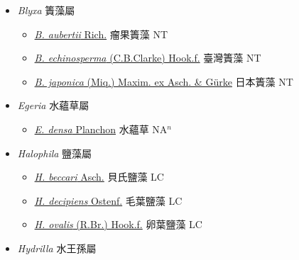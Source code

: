 
  \begin{itemize}
 \item[] \textit{Blyxa} 簀藻屬
                    
  \begin{itemize}
        \item[] \href{http://www.theplantlist.org/tpl1.1/search?q=Blyxa+aubertii}{\textit{B. aubertii} Rich.}   瘤果簀藻 NT
        \item[] \href{http://www.theplantlist.org/tpl1.1/search?q=Blyxa+echinosperma}{\textit{B. echinosperma} (C.B.Clarke) Hook.f.}   臺灣簀藻 NT
        \item[] \href{http://www.theplantlist.org/tpl1.1/search?q=Blyxa+japonica}{\textit{B. japonica} (Miq.) Maxim. ex Asch. \& Gürke}   日本簀藻 NT
  \end{itemize}
 \item[] \textit{Egeria} 水蘊草屬
                    
  \begin{itemize}
        \item[] \href{http://www.theplantlist.org/tpl1.1/search?q=Egeria+densa}{\textit{E. densa} Planchon}   水蘊草 NA$^n$
  \end{itemize}
 \item[] \textit{Halophila} 鹽藻屬
                    
  \begin{itemize}
        \item[] \href{http://www.theplantlist.org/tpl1.1/search?q=Halophila+beccari}{\textit{H. beccari} Asch.}   貝氏鹽藻 LC
        \item[] \href{http://www.theplantlist.org/tpl1.1/search?q=Halophila+decipiens}{\textit{H. decipiens} Ostenf.}   毛葉鹽藻 LC
        \item[] \href{http://www.theplantlist.org/tpl1.1/search?q=Halophila+ovalis}{\textit{H. ovalis} (R.Br.) Hook.f.}   卵葉鹽藻 LC
  \end{itemize}
 \item[] \textit{Hydrilla} 水王孫屬
                    

\end{itemize}
